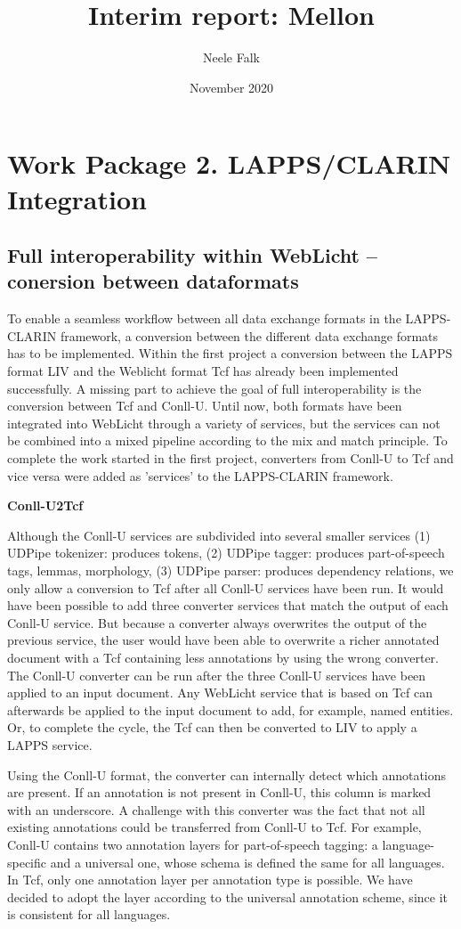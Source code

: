 \documentclass{article}
\title{Interim report: Mellon}
\author{Neele Falk }
\date{November 2020}
\begin{document}
\maketitle

\section{Work Package 2. LAPPS/CLARIN Integration}
\subsection{Full interoperability within WebLicht -- conersion between dataformats}
To enable a seamless workflow between all data exchange formats in the LAPPS-CLARIN framework, a conversion between the different data exchange formats has to be implemented. Within the first project a conversion between the LAPPS format LIV \parencite{liv} and the Weblicht format Tcf \parencite{Tcf} has already been implemented successfully. \parencite{firstphase} A missing part to achieve the goal of full interoperability is the conversion between Tcf and Conll-U. Until now, both formats have been integrated into WebLicht through a variety of services, but the services can not be combined into a mixed pipeline according to the mix and match principle. To complete the work started in the first project, converters from Conll-U to Tcf and vice versa were added as 'services' to the LAPPS-CLARIN framework.

\textbf{Conll-U2Tcf}

Although the Conll-U services are subdivided into several smaller services (1) UDPipe tokenizer: produces tokens, (2) UDPipe tagger: produces part-of-speech tags, lemmas, morphology, (3) UDPipe parser: produces dependency relations, we only allow a conversion to Tcf after all Conll-U services have been run. It would have been possible to add three converter services that match the output of each Conll-U service. But because a converter always overwrites the output of the previous service, the user would have been able to overwrite a richer annotated document with a Tcf containing less annotations by using the wrong converter. The Conll-U converter can be run after the three Conll-U services have been applied to an input document. Any WebLicht service that is based on Tcf can afterwards be applied to the input document to add, for example, named entities. Or, to complete the cycle, the Tcf can then be converted to LIV to apply a LAPPS service.

Using the Conll-U format, the converter can internally detect which annotations are present. If an annotation is not present in Conll-U, this column is marked with an underscore. A challenge with this converter was the fact that not all existing annotations could be transferred from Conll-U to Tcf. For example, Conll-U contains two annotation layers for part-of-speech tagging: a language-specific and a universal one, whose schema is defined the same for all languages. In Tcf, only one annotation layer per annotation type is possible. We have decided to adopt the layer according to the universal annotation scheme, since it is consistent for all languages. 
 
\end{document}
